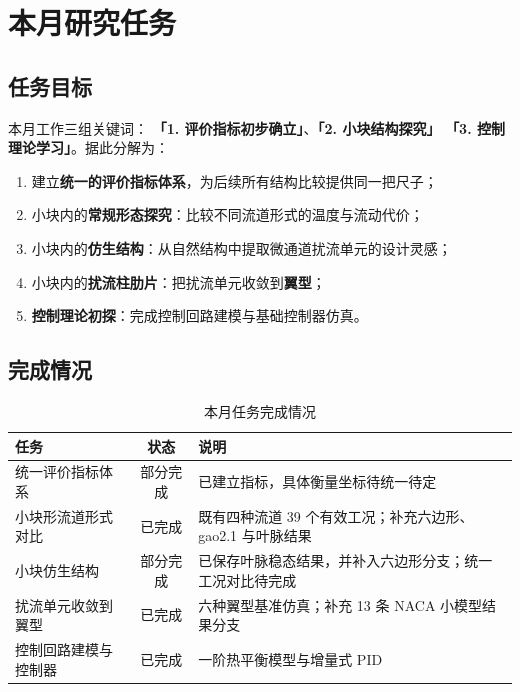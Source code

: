\documentclass[stage2,fontset=fandol]{ydzjreport}
\begin{document}
\makestagetwohead

\section{本月研究任务}

\subsection{任务目标}

本月工作三组关键词：
\textbf{「1. 评价指标初步确立」}、\textbf{「2. 小块结构探究」}
\textbf{「3. 控制理论学习」}。据此分解为：

\begin{enumerate}
  \item 建立\textbf{统一的评价指标体系}，为后续所有结构比较提供同一把尺子；
  \item 小块内的\textbf{常规形态探究}：比较不同流道形式的温度与流动代价；
  \item 小块内的\textbf{仿生结构}：从自然结构中提取微通道扰流单元的设计灵感；
  \item 小块内的\textbf{扰流柱肋片}：把扰流单元收敛到\textbf{翼型}；
  \item \textbf{控制理论初探}：完成控制回路建模与基础控制器仿真。
\end{enumerate}

\subsection{完成情况}

\begin{table}[H]
\centering
\caption{本月任务完成情况}
\label{tab:tasks}
\begin{tabularx}{\textwidth}{@{}Y c Y@{}}
\toprule
{} 任务 & 状态 & 说明 \\
\midrule
统一评价指标体系 & 部分完成 & 已建立指标，具体衡量坐标待统一待定 \\
小块形流道形式对比 & 已完成 & 既有四种流道 39 个有效工况；补充六边形、gao2.1 与叶脉结果 \\
小块仿生结构 & 部分完成 & 已保存叶脉稳态结果，并补入六边形分支；统一工况对比待完成 \\
扰流单元收敛到翼型 & 已完成 & 六种翼型基准仿真；补充 13 条 NACA 小模型结果分支 \\
控制回路建模与控制器 & 已完成 & 一阶热平衡模型与增量式 PID \\
\bottomrule
\end{tabularx}
\end{table}
\end{document}
